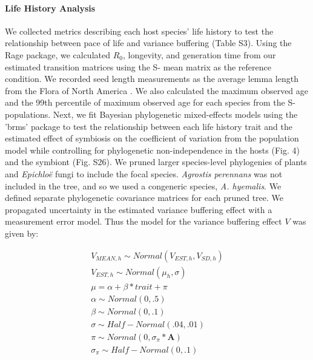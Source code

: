\documentclass[12pt]{article}
\begin{document}
\paragraph*{Life History Analysis}
We collected metrics describing each host species' life history to test the relationship between pace of life and variance buffering (Table S3). 
Using the Rage package, we calculated $R_0$, longevity, and generation time from our estimated transition matrices using the S- mean matrix as the reference condition.
We recorded seed length measurements as the average lemma length from the Flora of North America \cite{FloraNAonline}. 
We also calculated the maximum observed age and the 99th percentile of maximum observed age for each species from the S- populations.
Next, we fit Bayesian phylogenetic mixed-effects models using the 'brms' package \cite{Burkner2017brms} to test the relationship between each life history trait and the estimated effect of symbiosis on the coefficient of variation from the population model while controlling for phylogenetic non-independence in the hosts (Fig. 4) and the symbiont (Fig. S26).
We pruned larger species-level phylogenies of plants\cite{zanne2014three} and \emph{Epichlo\"{e}} fungi \cite{leuchtmann2014nomenclatural} to include the focal species.
\emph{Agrostis perennans} was not included in the tree, and so we used a congeneric species, \emph{A. hyemalis}. 
We defined separate phylogenetic covariance matrices for each pruned tree.
We propagated uncertainty in the estimated variance buffering effect with a measurement error model.
Thus the model for the variance buffering effect $V$ was given by:


\begin{subequations}
	\begin{align}
		V_{MEAN,h} \sim Normal(V_{EST,h}, V_{SD,h})\\
		V_{EST,h} \sim Normal(\mu_h,\sigma)\\
		\mu = \alpha + \beta*trait + \pi \\
		\alpha \sim Normal(0,.5)\\
		\beta \sim Normal(0,.1)\\
		\sigma \sim Half-Normal(.04,.01)\\
		\pi \sim Normal(0,\sigma_{\pi}*\mathbf{A})\\
		\sigma_{\pi} \sim Half-Normal(0,.1)
	\end{align}
\end{subequations}
\end{document}
